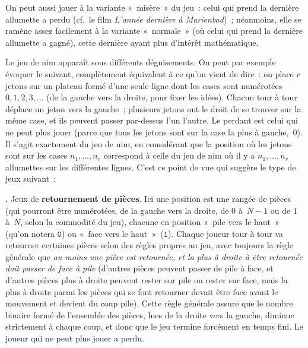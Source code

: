 \documentclass[12pt,a4paper]{article}
\theoremstyle{definition}
\newcommand\thingy{%
\refstepcounter{comcnt}\smallskip\noindent\textbf{\thecomcnt.} }
\newcommand{\defin}[2][]{\def\latexsucks{#1}\ifx\latexsucks\empty\index{#2}\else\index{\latexsucks}\fi\textbf{#2}}
\begin{document}
On peut aussi jouer à la variante « misère » du jeu : celui qui prend
la dernière allumette a perdu (cf. le film \textit{L'année dernière à
  Marienbad}) ; néanmoins, elle se ramène assez facilement à la
variante « normale » (où celui qui prend la dernière allumette a
gagné), cette dernière ayant plus d'intérêt mathématique.

Le jeu de nim apparaît sous différents déguisements.  On peut par
exemple évoquer le suivant, complètement équivalent à ce qu'on vient
de dire : on place $r$ jetons sur un plateau formé d'une seule ligne
dont les cases sont numérotées $0,1,2,3,\ldots$ (de la gauche vers la
droite, pour fixer les idées).  Chacun tour à tour déplace un jeton
vers la gauche ; plusieurs jetons ont le droit de se trouver sur la
même case, et ils peuvent passer par-dessus l'un l'autre.  Le perdant
est celui qui ne peut plus jouer (parce que tous les jetons sont sur
la case la plus à gauche, $0$).  Il s'agit exactement du jeu de nim,
en considérant que la position où les jetons sont sur les cases
$n_1,\ldots,n_r$ correspond à celle du jeu de nim où il y a
$n_1,\ldots,n_r$ allumettes sur les différentes lignes.  C'est ce
point de vue qui suggère le type de jeux suivant :

\thingy Jeux de \defin{retournement de pièces}.  Ici une position est
une rangée de pièces (qui pourront être numérotées, de la gauche vers
la droite, de $0$ à $N-1$ ou de $1$ à $N$, selon la commodité du jeu),
chacune en position « pile vers le haut » (qu'on notera $\mathtt{0}$)
ou « face vers le haut » ($\mathtt{1}$).  Chaque joueur tour à tour va
retourner certaines pièces selon des règles propres au jeu, avec
toujours la règle générale que \textit{au moins une pièce est
  retournée, et la plus à droite à être retournée doit passer de face
  à pile} (d'autres pièces peuvent passer de pile à face, et d'autres
pièces plus à droite peuvent rester sur pile ou rester sur face, mais
la plus à droite parmi les pièces qui se font retourner devait être
face avant le mouvement et devient du coup pile).  Cette règle
générale assure que le nombre binaire formé de l'ensemble des pièces,
lues de la droite vers la gauche, diminue strictement à chaque coup,
et donc que le jeu termine forcément en temps fini.  Le joueur qui ne
peut plus jouer a perdu.
\end{document}
